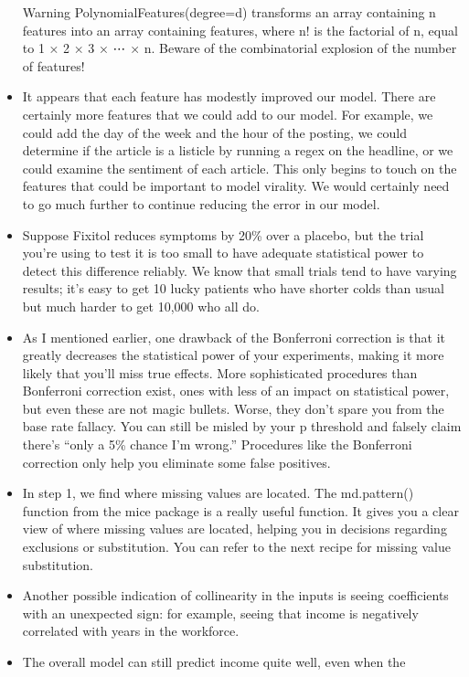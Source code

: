 \documentclass[]{book}
\theoremstyle{definition}
\theoremstyle{definition}
\theoremstyle{definition}
\theoremstyle{remark}
\begin{document}
\begin{itemize}
  Warning PolynomialFeatures(degree=d) transforms an array containing n
  features into an array containing features, where n! is the factorial
  of n, equal to 1 × 2 × 3 × ⋯ × n. Beware of the combinatorial
  explosion of the number of features!
\item
  It appears that each feature has modestly improved our model. There
  are certainly more features that we could add to our model. For
  example, we could add the day of the week and the hour of the posting,
  we could determine if the article is a listicle by running a regex on
  the headline, or we could examine the sentiment of each article. This
  only begins to touch on the features that could be important to model
  virality. We would certainly need to go much further to continue
  reducing the error in our model.
\item
  Suppose Fixitol reduces symptoms by 20\% over a placebo, but the trial
  you're using to test it is too small to have adequate statistical
  power to detect this difference reliably. We know that small trials
  tend to have varying results; it's easy to get 10 lucky patients who
  have shorter colds than usual but much harder to get 10,000 who all
  do.
\item
  As I mentioned earlier, one drawback of the Bonferroni correction is
  that it greatly decreases the statistical power of your experiments,
  making it more likely that you'll miss true effects. More
  sophisticated procedures than Bonferroni correction exist, ones with
  less of an impact on statistical power, but even these are not magic
  bullets. Worse, they don't spare you from the base rate fallacy. You
  can still be misled by your p threshold and falsely claim there's
  ``only a 5\% chance I'm wrong.'' Procedures like the Bonferroni
  correction only help you eliminate some false positives.
\item
  In step 1, we find where missing values are located. The md.pattern()
  function from the mice package is a really useful function. It gives
  you a clear view of where missing values are located, helping you in
  decisions regarding exclusions or substitution. You can refer to the
  next recipe for missing value substitution.
\item
  Another possible indication of collinearity in the inputs is seeing
  coefficients with an unexpected sign: for example, seeing that income
  is negatively correlated with years in the workforce.
\item
  The overall model can still predict income quite well, even when the

\end{itemize}
\end{document}

